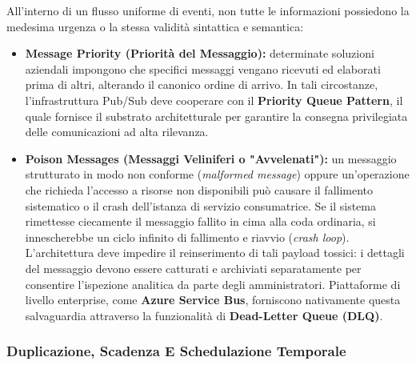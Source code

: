 \documentclass[11pt, a4paper]{article}
\begin{document}
All'interno di un flusso uniforme di eventi, non tutte le informazioni possiedono la medesima urgenza o la stessa validità sintattica e semantica:
\begin{itemize}
    \item \textbf{Message Priority (Priorità del Messaggio):} determinate soluzioni aziendali impongono che specifici messaggi vengano ricevuti ed elaborati prima di altri, alterando il canonico ordine di arrivo. In tali circostanze, l'infrastruttura Pub/Sub deve cooperare con il \textbf{Priority Queue Pattern}, il quale fornisce il substrato architetturale per garantire la consegna privilegiata delle comunicazioni ad alta rilevanza.
    \item \textbf{Poison Messages (Messaggi Veliniferi o "Avvelenati"):} un messaggio strutturato in modo non conforme (\emph{malformed message}) oppure un'operazione che richieda l'accesso a risorse non disponibili può causare il fallimento sistematico o il crash dell'istanza di servizio consumatrice. Se il sistema rimettesse ciecamente il messaggio fallito in cima alla coda ordinaria, si innescherebbe un ciclo infinito di fallimento e riavvio (\emph{crash loop}). L'architettura deve impedire il reinserimento di tali payload tossici: i dettagli del messaggio devono essere catturati e archiviati separatamente per consentire l'ispezione analitica da parte degli amministratori. Piattaforme di livello enterprise, come \textbf{Azure Service Bus}, forniscono nativamente questa salvaguardia attraverso la funzionalità di \textbf{Dead-Letter Queue (DLQ)}.
\end{itemize}

\subsubsection{Duplicazione, Scadenza E Schedulazione Temporale}
\end{document}
